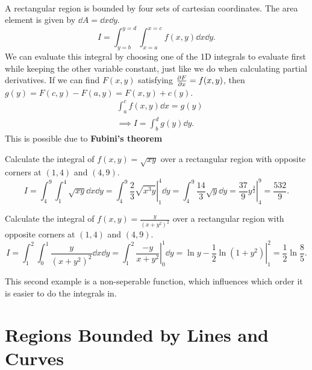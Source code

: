 \documentclass[../multivariate_calculus.tex]{subfiles}
\begin{document}
        \paragraph{}
        A rectangular region is bounded by four sets of cartesian coordinates.
        The area element is given by $\dd{A}=\dd{x}\dd{y}$.
        \begin{equation}
            I=\int_{y=b}^{y=d}\int_{x=a}^{x=c}f(x,y)\dd{x}\dd{y}.
        \end{equation}
        We can evaluate this integral by choosing one of the 1D integrals to evaluate first while keeping the other variable constant, just like we do when calculating partial derivatives.
        If we can find $F(x,y)$ satisfying $\pdv{F}{x}=f(x,y)$, then $g(y)=F(c,y)-F(a,y)=F(x,y)+c(y)$.
        \begin{align}
            &\int_a^c f(x,y)\dd{x}=g(y)\\
            &\implies I=\int_b^d g(y)\dd{y}.
        \end{align}
        This is possible due to \textbf{Fubini's theorem}
        \begin{example}
            Calculate the integral of $f(x,y)=\sqrt{xy}$ over a rectangular region with opposite corners at $(1,4)$ and $(4,9)$.
            \begin{equation}
                I=\int_4^9\int_1^4\sqrt{xy}\dd{x}\dd{y}=\int_4^9\left.\frac{2}{3}\sqrt{x^3y}\right|_1^4\dd{y}=\int_4^9\frac{14}{3}\sqrt{y}\dd{y}=\left.\frac{37}{9}y^{\frac{3}{2}}\right|_4^9=\frac{532}{9}.
            \end{equation}
        \end{example}
        \begin{example}
            Calculate the integral of $f(x,y)=\frac{y}{(x+y^2)^2}$ over a rectangular region with opposite corners at $(1,4)$ and $(4,9)$.
            \begin{equation}
                I=\int_1^2\int_0^1\frac{y}{(x+y^2)^2}\dd{x}\dd{y}=\int_1^2\left.\frac{-y}{x+y^2}\right|_0^1\dd{y}=\left.\ln y-\frac{1}{2}\ln(1+y^2)\right|_1^2=\frac{1}{2}\ln\frac{8}{5}.
            \end{equation}
        \end{example}
        This second example is a non-seperable function, which influences which order it is easier to do the integrals in.

    \section{Regions Bounded by Lines and Curves}
\end{document}
